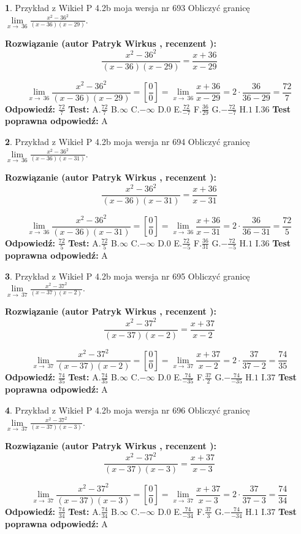 \documentclass[12pt, a4paper]{article}
\theoremstyle{definition} %
\newtheorem{zad}{}
\newcommand{\zadStart}[1]{\begin{zad}#1\newline}
\newcommand{\zadStop}{\end{zad}}
\newcommand{\rozwStart}[2]{\noindent \textbf{Rozwiązanie (autor #1 , recenzent #2): }\newline}
\newcommand{\rozwStop}{\newline}
\newcommand{\odpStart}{\noindent \textbf{Odpowiedź:}\newline}
\newcommand{\odpStop}{\newline}
\newcommand{\testStart}{\noindent \textbf{Test:}\newline}
\newcommand{\testStop}{\newline}
\newcommand{\kluczStart}{\noindent \textbf{Test poprawna odpowiedź:}\newline}
\newcommand{\kluczStop}{\newline}
\begin{document}
\zadStart{Przykład z Wikieł P 4.2b moja wersja nr 693}
Obliczyć granicę $\lim\limits_{x\to\ 36}\frac{x^{2}-36^{2}}{(x-36)(x-29)}$.
\zadStop
\rozwStart{Patryk Wirkus}{}
$$\frac{x^{2}-36^{2}}{(x-36)(x-29)}=\frac{x+36}{x-29}$$

$$\lim\limits_{x\to\ 36}\frac{x^{2}-36^{2}}{(x-36)(x-29)}=[\frac{0}{0}]=\lim\limits_{x\to\ 36}\frac{x+36}{x-29}=2 \cdot \frac{36}{36-29} = \frac{72}{7}$$
\rozwStop
\odpStart
$\frac{72}{7}$
\odpStop
\testStart
A.$\frac{72}{7}$
B.$\infty$
C.$-\infty$
D.$0$
E.$\frac{72}{-7}$
F.$\frac{36}{29}$
G.$-\frac{72}{-7}$
H.$1$
I.$36$
\testStop
\kluczStart
A
\kluczStop



\zadStart{Przykład z Wikieł P 4.2b moja wersja nr 694}
Obliczyć granicę $\lim\limits_{x\to\ 36}\frac{x^{2}-36^{2}}{(x-36)(x-31)}$.
\zadStop
\rozwStart{Patryk Wirkus}{}
$$\frac{x^{2}-36^{2}}{(x-36)(x-31)}=\frac{x+36}{x-31}$$

$$\lim\limits_{x\to\ 36}\frac{x^{2}-36^{2}}{(x-36)(x-31)}=[\frac{0}{0}]=\lim\limits_{x\to\ 36}\frac{x+36}{x-31}=2 \cdot \frac{36}{36-31} = \frac{72}{5}$$
\rozwStop
\odpStart
$\frac{72}{5}$
\odpStop
\testStart
A.$\frac{72}{5}$
B.$\infty$
C.$-\infty$
D.$0$
E.$\frac{72}{-5}$
F.$\frac{36}{31}$
G.$-\frac{72}{-5}$
H.$1$
I.$36$
\testStop
\kluczStart
A
\kluczStop



\zadStart{Przykład z Wikieł P 4.2b moja wersja nr 695}
Obliczyć granicę $\lim\limits_{x\to\ 37}\frac{x^{2}-37^{2}}{(x-37)(x-2)}$.
\zadStop
\rozwStart{Patryk Wirkus}{}
$$\frac{x^{2}-37^{2}}{(x-37)(x-2)}=\frac{x+37}{x-2}$$

$$\lim\limits_{x\to\ 37}\frac{x^{2}-37^{2}}{(x-37)(x-2)}=[\frac{0}{0}]=\lim\limits_{x\to\ 37}\frac{x+37}{x-2}=2 \cdot \frac{37}{37-2} = \frac{74}{35}$$
\rozwStop
\odpStart
$\frac{74}{35}$
\odpStop
\testStart
A.$\frac{74}{35}$
B.$\infty$
C.$-\infty$
D.$0$
E.$\frac{74}{-35}$
F.$\frac{37}{2}$
G.$-\frac{74}{-35}$
H.$1$
I.$37$
\testStop
\kluczStart
A
\kluczStop



\zadStart{Przykład z Wikieł P 4.2b moja wersja nr 696}
Obliczyć granicę $\lim\limits_{x\to\ 37}\frac{x^{2}-37^{2}}{(x-37)(x-3)}$.
\zadStop
\rozwStart{Patryk Wirkus}{}
$$\frac{x^{2}-37^{2}}{(x-37)(x-3)}=\frac{x+37}{x-3}$$

$$\lim\limits_{x\to\ 37}\frac{x^{2}-37^{2}}{(x-37)(x-3)}=[\frac{0}{0}]=\lim\limits_{x\to\ 37}\frac{x+37}{x-3}=2 \cdot \frac{37}{37-3} = \frac{74}{34}$$
\rozwStop
\odpStart
$\frac{74}{34}$
\odpStop
\testStart
A.$\frac{74}{34}$
B.$\infty$
C.$-\infty$
D.$0$
E.$\frac{74}{-34}$
F.$\frac{37}{3}$
G.$-\frac{74}{-34}$
H.$1$
I.$37$
\testStop
\kluczStart
A
\kluczStop
\end{document}
